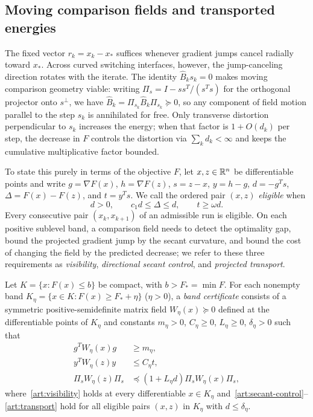 \subsection{Moving comparison fields and transported energies}

The fixed vector $r_k=x_k-x_*$ suffices whenever gradient jumps cancel radially
toward $x_*$. Across curved switching interfaces, however, the jump-canceling
direction rotates with the iterate. The identity $\widehat B_ks_k=0$ makes
moving comparison geometry viable: writing $\Pi_s=I-ss^T/(s^Ts)$ for the
orthogonal projector onto $s^\perp$, we have
$\widehat B_k=\Pi_{s_k}\widehat B_k\Pi_{s_k}\succeq0$, so any component of field
motion parallel to the step $s_k$ is annihilated for free. Only transverse
distortion perpendicular to $s_k$ increases the energy; when that factor is
$1+O(d_k)$ per step, the decrease in $F$ controls the distortion via
$\sum_kd_k<\infty$ and keeps the cumulative multiplicative factor bounded.

To state this purely in terms of the objective $F$, let $x,z\in\mathbb R^n$ be
differentiable points and write $g=\nabla F(x)$, $h=\nabla F(z)$, $s=z-x$,
$y=h-g$, $d=-g^Ts$, $\Delta=F(x)-F(z)$, and $t=y^Ts$. We call the ordered pair
$(x,z)$ \emph{eligible} when
\[
 d>0,\qquad c_1d\le\Delta\le d,\qquad t\ge\omega d.
\]
Every consecutive pair $(x_k,x_{k+1})$ of an admissible run is eligible. On
each positive sublevel band, a comparison field needs to detect the optimality
gap, bound the projected gradient jump by the secant curvature, and bound the
cost of changing the field by the predicted decrease; we refer to these three
requirements as \emph{visibility}, \emph{directional secant control}, and
\emph{projected transport}.

\begin{definition}\label{art:band-certificate}
Let $K=\{x:F(x)\le b\}$ be compact, with $b>F_*=\min F$.
For each nonempty band $K_\eta=\{x\in K:F(x)\ge F_*+\eta\}$ ($\eta>0$), a
\emph{band certificate} consists of a symmetric positive-semidefinite matrix
field $W_\eta(x)\succeq0$ defined at the differentiable points of $K_\eta$ and
constants $m_\eta>0$, $C_\eta\ge0$, $L_\eta\ge0$, $\delta_\eta>0$ such that
\begin{align}
 g^TW_\eta(x)g&\ge m_\eta,\label{art:visibility}\\
 y^TW_\eta(z)y&\le C_\eta t,\label{art:secant-control}\\
 \Pi_sW_\eta(z)\Pi_s&\preceq
 (1+L_\eta d)\Pi_sW_\eta(x)\Pi_s,\label{art:transport}
\end{align}
where~\eqref{art:visibility} holds at every differentiable $x\in K_\eta$
and~\eqref{art:secant-control}--\eqref{art:transport} hold for all eligible
pairs $(x,z)$ in $K_\eta$ with $d\le\delta_\eta$.
\end{definition}

